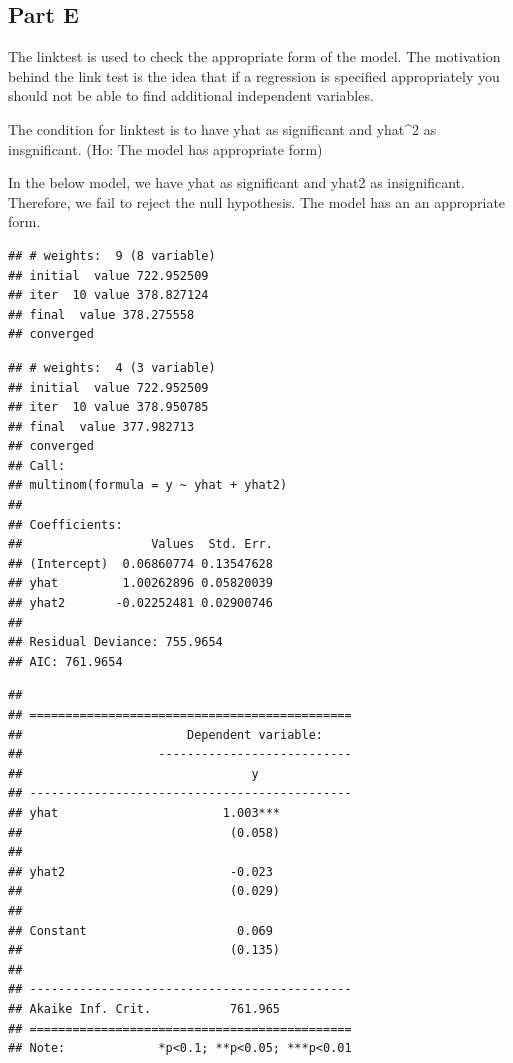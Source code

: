 \documentclass[
]{article}
\begin{document}
\hypertarget{part-e}{%
\subsection{Part E}\label{part-e}}

The linktest is used to check the appropriate form of the model. The
motivation behind the link test is the idea that if a regression is
specified appropriately you should not be able to find additional
independent variables.

The condition for linktest is to have yhat as significant and yhat\^{}2
as insgnificant. (Ho: The model has appropriate form)

In the below model, we have yhat as significant and yhat2 as
insignificant. Therefore, we fail to reject the null hypothesis. The
model has an an appropriate form.

\begin{verbatim}
## # weights:  9 (8 variable)
## initial  value 722.952509 
## iter  10 value 378.827124
## final  value 378.275558 
## converged
\end{verbatim}

\begin{verbatim}
## # weights:  4 (3 variable)
## initial  value 722.952509 
## iter  10 value 378.950785
## final  value 377.982713 
## converged
## Call:
## multinom(formula = y ~ yhat + yhat2)
## 
## Coefficients:
##                  Values  Std. Err.
## (Intercept)  0.06860774 0.13547628
## yhat         1.00262896 0.05820039
## yhat2       -0.02252481 0.02900746
## 
## Residual Deviance: 755.9654 
## AIC: 761.9654
\end{verbatim}

\begin{verbatim}
## 
## =============================================
##                       Dependent variable:    
##                   ---------------------------
##                                y             
## ---------------------------------------------
## yhat                       1.003***          
##                             (0.058)          
##                                              
## yhat2                       -0.023           
##                             (0.029)          
##                                              
## Constant                     0.069           
##                             (0.135)          
##                                              
## ---------------------------------------------
## Akaike Inf. Crit.           761.965          
## =============================================
## Note:             *p<0.1; **p<0.05; ***p<0.01
\end{verbatim}
\end{document}
